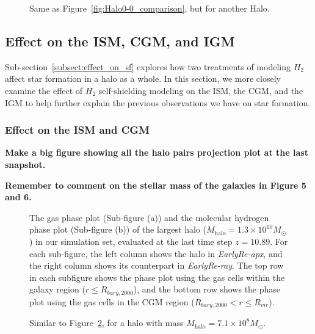 \documentclass[linenumbers, twocolumn]{aastex631}
\begin{document}
\begin{figure}
	\caption{Same as Figure~\ref{fig:Halo0-0_comparison}, but for another Halo.}
	\label{fig:Halo3-3_comparison}
\end{figure}


\subsection{Effect on the ISM, CGM, and IGM}

Sub-section~\ref{subsect:effect_on_sf} explores how two treatments of modeling $H_{2}$ affect star formation in a halo as a whole. In this section, we more closely examine the effect of $H_{2}$ self-shielding modeling on the ISM, the CGM, and the IGM to help further explain the previous observations we have on star formation. 


\subsubsection{Effect on the ISM and CGM}

\textbf{Make a big figure showing all the halo pairs projection plot at the last snapshot.}

\textbf{Remember to comment on the stellar mass of the galaxies in Figure 5 and 6.}

\begin{figure}
    \caption{The gas phase plot (Sub-figure (a)) and the molecular hydrogen phase plot (Sub-figure (b)) of the largest halo ($M_{\mathrm{halo}} = 1.3\times10^{10} M_\odot$) in our simulation set, evaluated at the last time step $z = 10.89$. For each sub-figure, the left column shows the halo in \textit{EarlyRe-apx}, and the right column shows its counterpart in \textit{EarlyRe-ray}. The top row in each subfigure shows the phase plot using the gas cells within the galaxy region ($r \leq R_{bary,2000}$), and the bottom row shows the phase plot using the gas cells in the CGM region ($R_{bary,2000} < r \leq R_{vir}$).} 
    \label{fig:phaseplot_Halo0-0}
\end{figure}

\begin{figure}
    \caption{Similar to Figure~\ref{fig:phaseplot_Halo0-0}, for a halo with mass $M_{\mathrm{halo}} = 7.1\times 10^{8} M_\odot$.}
    \label{fig:phaseplot_Halo18-19}
\end{figure}
\end{document}
